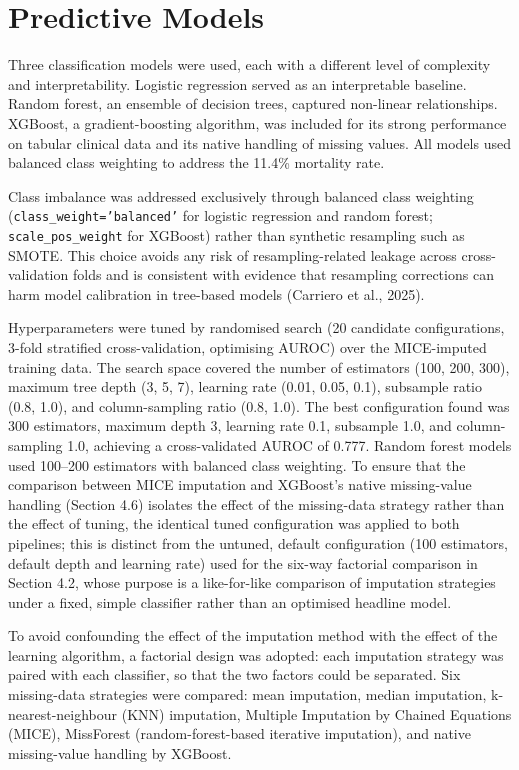 \documentclass[12pt,a4paper]{report}
\begin{document}
\section{Predictive Models}
Three classification models were used, each with a different level of complexity and interpretability. Logistic regression served as an interpretable baseline. Random forest, an ensemble of decision trees, captured non-linear relationships. XGBoost, a gradient-boosting algorithm, was included for its strong performance on tabular clinical data and its native handling of missing values. All models used balanced class weighting to address the 11.4\% mortality rate.

\label{sec:class-imbalance-method}
Class imbalance was addressed exclusively through balanced class weighting (\texttt{class\_weight='balanced'} for logistic regression and random forest; \texttt{scale\_pos\_weight} for XGBoost) rather than synthetic resampling such as SMOTE. This choice avoids any risk of resampling-related leakage across cross-validation folds and is consistent with evidence that resampling corrections can harm model calibration in tree-based models (Carriero et al., 2025).

Hyperparameters were tuned by randomised search (20 candidate configurations, 3-fold stratified cross-validation, optimising AUROC) over the MICE-imputed training data. The search space covered the number of estimators (100, 200, 300), maximum tree depth (3, 5, 7), learning rate (0.01, 0.05, 0.1), subsample ratio (0.8, 1.0), and column-sampling ratio (0.8, 1.0). The best configuration found was 300 estimators, maximum depth 3, learning rate 0.1, subsample 1.0, and column-sampling 1.0, achieving a cross-validated AUROC of 0.777. Random forest models used 100--200 estimators with balanced class weighting. To ensure that the comparison between MICE imputation and XGBoost's native missing-value handling (Section 4.6) isolates the effect of the missing-data strategy rather than the effect of tuning, the identical tuned configuration was applied to both pipelines; this is distinct from the untuned, default configuration (100 estimators, default depth and learning rate) used for the six-way factorial comparison in Section 4.2, whose purpose is a like-for-like comparison of imputation strategies under a fixed, simple classifier rather than an optimised headline model.

To avoid confounding the effect of the imputation method with the effect of the learning algorithm, a factorial design was adopted: each imputation strategy was paired with each classifier, so that the two factors could be separated. Six missing-data strategies were compared: mean imputation, median imputation, k-nearest-neighbour (KNN) imputation, Multiple Imputation by Chained Equations (MICE), MissForest (random-forest-based iterative imputation), and native missing-value handling by XGBoost.
\end{document}
